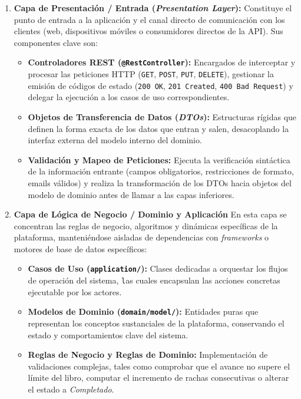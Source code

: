 \documentclass[12pt, atypical, journal]{article}
\begin{document}
\begin{enumerate}
	\item \textbf{Capa de Presentación / Entrada (\textit{Presentation Layer}):} 
	Constituye el punto de entrada a la aplicación y el canal directo de comunicación con los clientes (web, dispositivos móviles o consumidores directos de la API). Sus componentes clave son:
	\begin{itemize}
		\item \textbf{Controladores REST (\texttt{@RestController}):} Encargados de interceptar y procesar las peticiones HTTP (\texttt{GET}, \texttt{POST}, \texttt{PUT}, \texttt{DELETE}), gestionar la emisión de códigos de estado (\texttt{200 OK}, \texttt{201 Created}, \texttt{400 Bad Request}) y delegar la ejecución a los casos de uso correspondientes.
		\item \textbf{Objetos de Transferencia de Datos (\textit{DTOs}):} Estructuras rígidas que definen la forma exacta de los datos que entran y salen, desacoplando la interfaz externa del modelo interno del dominio.
		\item \textbf{Validación y Mapeo de Peticiones:} Ejecuta la verificación sintáctica de la información entrante (campos obligatorios, restricciones de formato, emails válidos) y realiza la transformación de los DTOs hacia objetos del modelo de dominio antes de llamar a las capas inferiores.
	\end{itemize}
	
	\item \textbf{Capa de Lógica de Negocio / Dominio y Aplicación} 
	En esta capa se concentran las reglas de negocio, algoritmos y dinámicas específicas de la plataforma, manteniéndose aisladas de dependencias con \textit{frameworks} o motores de base de datos específicos:
	\begin{itemize}
		\item \textbf{Casos de Uso (\texttt{application/}):} Clases dedicadas a orquestar los flujos de operación del sistema, \texttt las cuales encapsulan las acciones concretas ejecutable por los actores.
		\item \textbf{Modelos de Dominio (\texttt{domain/model/}):} Entidades puras que representan los conceptos sustanciales de la plataforma, conservando el estado y comportamientos clave del sistema.
		\item \textbf{Reglas de Negocio y Reglas de Dominio:} Implementación de validaciones complejas, tales como comprobar que el avance no supere el límite del libro, computar el incremento de rachas consecutivas o alterar el estado a \textit{Completado}.
	\end{itemize}
	

\end{enumerate}
\end{document}

